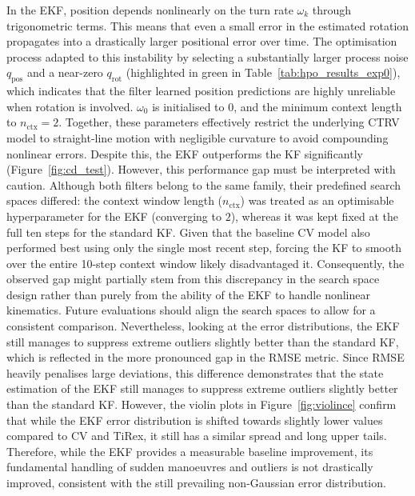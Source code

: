 In the \ac{EKF}, position depends nonlinearly on the turn rate $\omega_k$ through trigonometric terms. This means that even a small error in the estimated rotation propagates into a drastically larger positional error over time.
The optimisation process adapted to this instability by selecting a substantially larger process noise $q_\text{pos}$ and a near-zero $q_\text{rot}$ (highlighted in green in Table~\ref{tab:hpo_results_exp0}), which indicates that the filter learned position predictions are highly unreliable when rotation is involved.
$\omega_0$ is initialised to $0$, and the minimum context length to $n_\text{ctx} = 2$.
Together, these parameters effectively restrict the underlying \ac{CTRV} model to straight-line motion with negligible curvature to avoid compounding nonlinear errors. Despite this, the \ac{EKF} outperforms the \ac{KF} significantly (Figure~\ref{fig:cd_test}). 
However, this performance gap must be interpreted with caution. Although both filters belong to the same family, their predefined search spaces differed: the context window length ($n_\text{ctx}$) was treated as an optimisable hyperparameter for the \ac{EKF} (converging to $2$), whereas it was kept fixed at the full ten steps for the standard \ac{KF}. Given that the baseline \ac{CV} model also performed best using only the single most recent step, forcing the \ac{KF} to smooth over the entire 10-step context window likely disadvantaged it. Consequently, the observed gap might partially stem from this discrepancy in the search space design rather than purely from the ability of the \ac{EKF} to handle nonlinear kinematics. Future evaluations should align the search spaces to allow for a consistent comparison.
Nevertheless, looking at the error distributions, the \ac{EKF} still manages to suppress extreme outliers slightly better than the standard \ac{KF}, which is reflected in the more pronounced gap in the \ac{RMSE} metric. Since \ac{RMSE} heavily penalises large deviations, this difference demonstrates that the state estimation of the \ac{EKF} still manages to suppress extreme outliers slightly better than the standard \ac{KF}.
However, the violin plots in Figure~\ref{fig:violince} confirm that while the \ac{EKF} error distribution is shifted towards slightly lower values compared to \ac{CV} and TiRex, it still has a similar spread and long upper tails.
Therefore, while the \ac{EKF} provides a measurable baseline improvement, its fundamental handling of sudden manoeuvres and outliers is not drastically improved, consistent with the still prevailing non-Gaussian error distribution.


